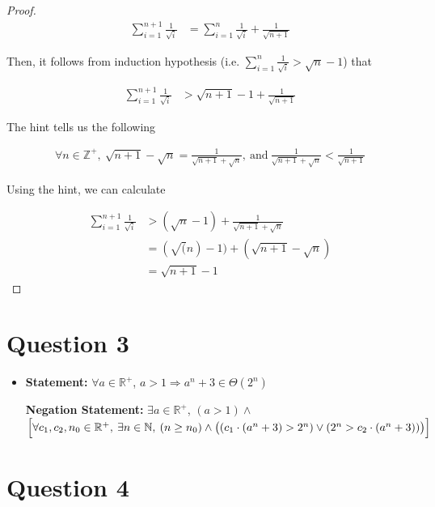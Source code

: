 \documentclass[12pt]{article}
\begin{document}
\begin{itemize}
\begin{proof}
        \begin{align}
            \sum\limits_{i=1}^{n+1} \frac{1}{\sqrt{i}} &= \sum\limits_{i=1}^n \frac{1}{\sqrt{i}} + \frac{1}{\sqrt{n+1}}
        \end{align}

        \bigskip

        Then, it follows from induction hypothesis (i.e. $\sum\limits_{i=1}^{n} \frac{1}{\sqrt{i}} > \sqrt{n} - 1$) that

        \begin{align}
            \sum\limits_{i=1}^{n+1} \frac{1}{\sqrt{i}} &>  \sqrt{n+1} - 1 + \frac{1}{\sqrt{n+1}}
        \end{align}

        \bigskip

        The hint tells us the following

        \begin{align}
            \forall n \in \mathbb{Z}^{+},\:\sqrt{n+1} - \sqrt{n} = \frac{1}{\sqrt{n+1} + \sqrt{n}},\:\text{and}\:\frac{1}{\sqrt{n+1} + \sqrt{n}} < \frac{1}{\sqrt{n+1}}
        \end{align}

        \bigskip

        Using the hint, we can calculate

        \begin{align}
            \sum\limits_{i=1}^{n+1} \frac{1}{\sqrt{i}} &> (\sqrt{n}-1) + \frac{1}{\sqrt{n+1} + \sqrt{n}}\\
            &= (\sqrt(n) - 1) + (\sqrt{n+1} - \sqrt{n})\\
            &= \sqrt{n+1} - 1
        \end{align}
    \end{proof}

\end{itemize}

\section*{Question 3}
\begin{itemize}
    \item

    \textbf{Statement:} $\forall a \in \mathbb{R}^{+}$, $a > 1 \Rightarrow a^n + 3 \in \Theta(2^n)$

    \bigskip

    \textbf{Negation Statement:} $\exists a \in \mathbb{R}^{+}$, $(a > 1) \land $
    $\Bigl[ \forall c_1,c_2,n_0 \in \mathbb{R}^{+},\:\exists n \in \mathbb{N},\:
    (n \geq n_0) \land \bigl( (c_1 \cdot (a^n+3) > 2^n) \lor (2^n > c_2 \cdot (a^n+3)) \bigr) \Bigr]$
 \end{itemize}

\section*{Question 4}
\end{document}
